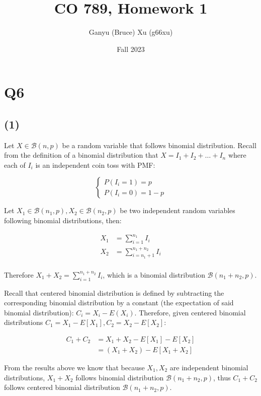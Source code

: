 \documentclass{article}
\title{CO 789, Homework 1}
\author{Ganyu (Bruce) Xu (g66xu)}
\date{Fall 2023}
\begin{document}

\section*{Q6}
\subsection*{(1)}
Let $X \in \mathcal{B}(n, p)$ be a random variable that follows binomial distribution. Recall from the definition of a binomial distribution that $X = I_1 + I_2 + \ldots + I_n$ where each of $I_i$ is an independent coin toss with PMF:

$$
\begin{cases}
P(I_i=1) = p \\
P(I_i=0) = 1-p
\end{cases}
$$

Let $X_1 \in \mathcal{B}(n_1, p), X_2 \in \mathcal{B}(n_2, p)$ be two independent random variables following binomial distributions, then:

$$
\begin{aligned}
X_1 &= \sum_{i=1}^{n_1} I_i \\
X_2 &= \sum_{i=n_1 + 1}^{n_1 + n_2} I_i \\
\end{aligned}
$$

Therefore $X_1 + X_2 = \sum_{i=1}^{n_1 + n_2} I_i$, which is a binomial distribution $\mathcal{B}(n_1 + n_2, p)$.

Recall that centered binomial distribution is defined by subtracting the corresponding binomial distribution by a constant (the expectation of said binomial distribution): $C_i = X_i - E(X_i)$. Therefore, given centered binomial distributions $C_1 = X_1 - E[X_1], C_2 = X_2 - E[X_2]$:

$$
\begin{aligned}
C_1 + C_2 &= X_1 + X_2 - E[X_1] - E[X_2] \\
&= (X_1 + X_2) - E[X_1 + X_2]
\end{aligned}
$$

From the results above we know that because $X_1, X_2$ are independent binomial distributions, $X_1 + X_2$ follows binomial distribution $\mathcal{B}(n_1 + n_2, p)$, thus $C_1 + C_2$ follows centered binomial distribution $\mathcal{B}(n_1 + n_2, p)$.
\end{document}
